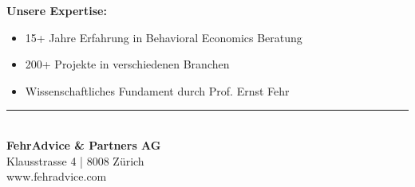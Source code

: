\documentclass{fehradvice-report}
\begin{document}
\textbf{Unsere Expertise:}
\begin{itemize}
    \item 15+ Jahre Erfahrung in Behavioral Economics Beratung
    \item 200+ Projekte in verschiedenen Branchen
    \item Wissenschaftliches Fundament durch Prof. Ernst Fehr
\end{itemize}

\vfill

\begin{center}
\textcolor{fadarkblue}{\rule{0.8\textwidth}{1pt}}\\[0.5cm]
\textbf{FehrAdvice \& Partners AG}\\
Klausstrasse 4 | 8008 Zürich\\
www.fehradvice.com
\end{center}
\end{document}
